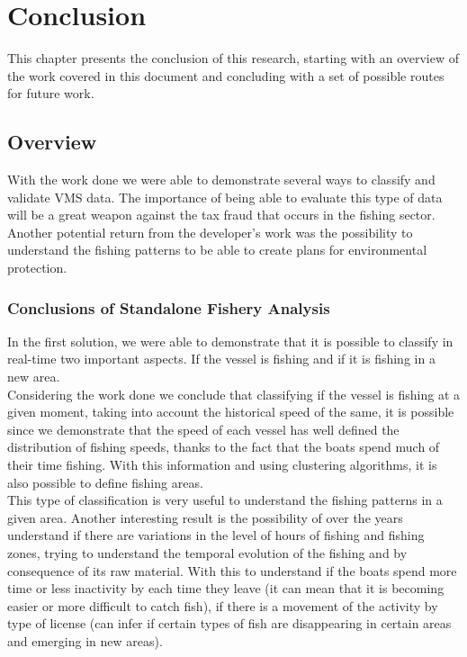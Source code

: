 % 
%  
%
\chapter{Conclusion}
\label{cha:conclusion}

This chapter presents the conclusion of this research, starting with an overview of the work covered in this document and concluding with a set of possible routes for future work.

\section{Overview} %
\label{sec:overview}
With the work done we were able to demonstrate several ways to classify and validate VMS data. The importance of being able to evaluate this type of data will be a great weapon against the tax fraud that occurs in the fishing sector. Another potential return from the developer's work was the possibility to understand the fishing patterns to be able to create plans for environmental protection.

\subsection{Conclusions of Standalone Fishery Analysis} %
\label{sec:con_sfa}

In the first solution, we were able to demonstrate that it is possible to classify in real-time two important aspects. If the vessel is fishing and if it is fishing in a new area.\\
Considering the work done we conclude that classifying if the vessel is fishing at a given moment, taking into account the historical speed of the same, it is possible since we demonstrate that the speed of each vessel has well defined the distribution of fishing speeds, thanks to the fact that the boats spend much of their time fishing.
With this information and using clustering algorithms, it is also possible to define fishing areas.\\

This type of classification is very useful to understand the fishing patterns in a given area. Another interesting result is the possibility of over the years understand if there are variations in the level of hours of fishing and fishing zones, trying to understand the temporal evolution of the fishing and by consequence of its raw material. With this to understand if the boats spend more time or less inactivity by each time they leave (it can mean that it is becoming easier or more difficult to catch fish), if there is a movement of the activity by type of license (can infer if certain types of fish are disappearing in certain areas and emerging in new areas).


